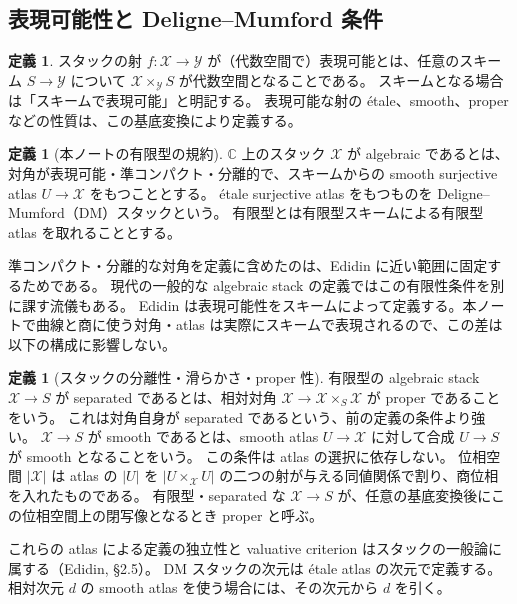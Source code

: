 \documentclass[dvipdfmx,a4paper,11pt]{article}
\theoremstyle{definition}
\newtheorem{dfn}[thm]{定義}
\newcommand{\C}{\mathbb C}\newcommand{\R}{\mathbb R}\newcommand{\Z}{\mathbb Z}\newcommand{\Q}{\mathbb Q}
\begin{document}
\subsection{表現可能性と Deligne--Mumford 条件}
\begin{dfn}
スタックの射 $f:\mathcal X\to\mathcal Y$ が（代数空間で）表現可能とは、任意のスキーム $S\to\mathcal Y$ について $\mathcal X\times_{\mathcal Y}S$ が代数空間となることである。
スキームとなる場合は「スキームで表現可能」と明記する。
表現可能な射の étale、smooth、proper などの性質は、この基底変換により定義する。
\end{dfn}
\begin{dfn}[本ノートの有限型の規約]
$\C$ 上のスタック $\mathcal X$ が algebraic であるとは、対角が表現可能・準コンパクト・分離的で、スキームからの smooth surjective atlas $U\to\mathcal X$ をもつこととする。
étale surjective atlas をもつものを Deligne--Mumford（DM）スタックという。
有限型とは有限型スキームによる有限型 atlas を取れることとする。
\end{dfn}
準コンパクト・分離的な対角を定義に含めたのは、Edidin に近い範囲に固定するためである。
現代の一般的な algebraic stack の定義ではこの有限性条件を別に課す流儀もある。
Edidin は表現可能性をスキームによって定義する。本ノートで曲線と商に使う対角・atlas は実際にスキームで表現されるので、この差は以下の構成に影響しない。

\begin{dfn}[スタックの分離性・滑らかさ・proper 性]
有限型の algebraic stack $\mathcal X\to S$ が separated であるとは、相対対角 $\mathcal X\to\mathcal X\times_S\mathcal X$ が proper であることをいう。
これは対角自身が separated であるという、前の定義の条件より強い。
$\mathcal X\to S$ が smooth であるとは、smooth atlas $U\to\mathcal X$ に対して合成 $U\to S$ が smooth となることをいう。
この条件は atlas の選択に依存しない。
位相空間 $|\mathcal X|$ は atlas の $|U|$ を $|U\times_{\mathcal X}U|$ の二つの射が与える同値関係で割り、商位相を入れたものである。
有限型・separated な $\mathcal X\to S$ が、任意の基底変換後にこの位相空間上の閉写像となるとき proper と呼ぶ。
\end{dfn}
これらの atlas による定義の独立性と valuative criterion はスタックの一般論に属する（Edidin, \S2.5）。
DM スタックの次元は étale atlas の次元で定義する。相対次元 $d$ の smooth atlas を使う場合には、その次元から $d$ を引く。
\end{document}
